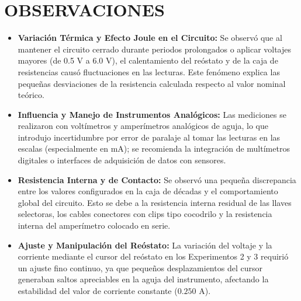 \documentclass[12pt,a4paper]{article}
\begin{document}
\section{OBSERVACIONES}
\begin{itemize}
    \item \textbf{Variación Térmica y Efecto Joule en el Circuito:} Se observó que al mantener el circuito cerrado durante periodos prolongados o aplicar voltajes mayores (de 0.5 V a 6.0 V), el calentamiento del reóstato y de la caja de resistencias causó fluctuaciones en las lecturas. Este fenómeno explica las pequeñas desviaciones de la resistencia calculada respecto al valor nominal teórico.
    \item \textbf{Influencia y Manejo de Instrumentos Analógicos:} Las mediciones se realizaron con voltímetros y amperímetros analógicos de aguja, lo que introdujo incertidumbre por error de paralaje al tomar las lecturas en las escalas (especialmente en mA); se recomienda la integración de multímetros digitales o interfaces de adquisición de datos con sensores.
    \item \textbf{Resistencia Interna y de Contacto:} Se observó una pequeña discrepancia entre los valores configurados en la caja de décadas y el comportamiento global del circuito. Esto se debe a la resistencia interna residual de las llaves selectoras, los cables conectores con clips tipo cocodrilo y la resistencia interna del amperímetro colocado en serie.
    \item \textbf{Ajuste y Manipulación del Reóstato:} La variación del voltaje y la corriente mediante el cursor del reóstato en los Experimentos 2 y 3 requirió un ajuste fino continuo, ya que pequeños desplazamientos del cursor generaban saltos apreciables en la aguja del instrumento, afectando la estabilidad del valor de corriente constante ($0.250\text{ A}$).
\end{itemize}
\end{document}
